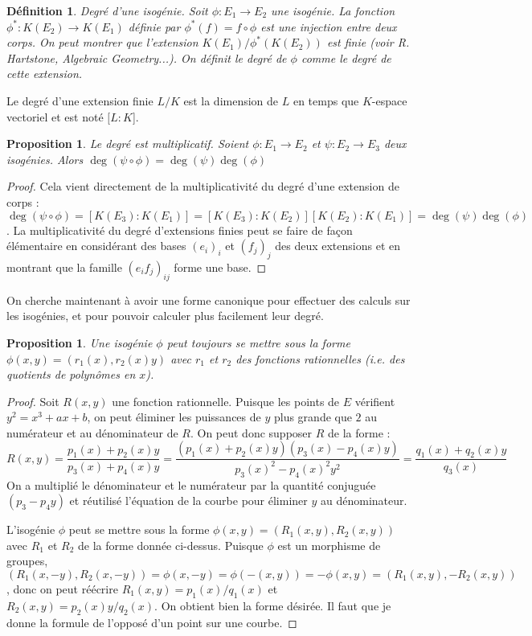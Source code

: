 \documentclass{article}
\theoremstyle{plain}%
\newtheorem{prop}[thm]{Proposition}
\newtheorem{deff}[thm]{Définition}
\theoremstyle{definition}%
\begin{document}
\begin{deff}
  Degré d'une isogénie. Soit $\phi : E_1 \to E_2$ une isogénie. La fonction $\phi^* : K(E_2) \to K(E_1)$ définie par $\phi^*(f) = f \circ \phi$ est une injection entre deux corps. On peut montrer que l'extension $K(E_1)/\phi^*(K(E_2))$ est finie (voir R. Hartstone, Algebraic Geometry...). On définit le degré de $\phi$ comme le degré de cette extension.
\end{deff}

Le degré d'une extension finie $L/K$ est la dimension de $L$ en temps que $K$-espace vectoriel et est noté $[L : K$].

\begin{prop}
  Le degré est multiplicatif. Soient $\phi : E_1\to E_2$ et $\psi : E_2\to E_3$ deux isogénies. Alors $\deg(\psi \circ \phi) = \deg(\psi)\deg(\phi)$ 
\end{prop}

\begin{proof}
  Cela vient directement de la multiplicativité du degré d'une extension de corps : $\deg(\psi \circ \phi) = [K(E_3) :K(E_1)] = [K(E_3):K(E_2)][K(E_2):K(E_1)] = \deg(\psi)\deg(\phi)$. La multiplicativité du degré d'extensions finies peut se faire de façon élémentaire en considérant des bases $(e_i)_i$ et $(f_j)_j$ des deux extensions et en montrant que la famille $(e_if_j)_{ij}$ forme une base.
\end{proof}

On cherche maintenant à avoir une forme canonique pour effectuer des calculs sur les isogénies, et pour pouvoir calculer plus facilement leur degré.

\begin{prop}
  Une isogénie $\phi$ peut toujours se mettre sous la forme $\phi(x, y) = (r_1(x), r_2(x)y)$ avec $r_1$ et $r_2$ des fonctions rationnelles (i.e. des quotients de polynômes en $x$).
\end{prop}

\begin{proof}
  Soit $R(x, y)$ une fonction rationnelle. Puisque les points de $E$ vérifient $y^2 = x^3 + ax + b$, on peut éliminer les puissances de $y$ plus grande que $2$ au numérateur et au dénominateur de $R$. On peut donc supposer $R$ de la forme : $$R(x, y) = \frac{p_1(x) + p_2(x)y}{p_3(x)+p_4(x)y} = \frac{(p_1(x) + p_2(x)y)(p_3(x)-p_4(x)y)}{p_3(x)^2 - p_4(x)^2y^2} = \frac{q_1(x) +q_2(x)y}{q_3(x)} $$
 On a multiplié le dénominateur et le numérateur par la quantité conjuguée $(p_3-p_4y)$ et réutilisé l'équation de la courbe pour éliminer $y$ au dénominateur.

 L'isogénie $\phi$ peut se mettre sous la forme $\phi(x, y) = (R_1(x, y), R_2(x, y))$ avec $R_1$ et $R_2$ de la forme donnée ci-dessus. Puisque $\phi$ est un morphisme de groupes, 
 $(R_1(x, -y), R_2(x, -y)) = \phi(x, -y) = \phi(-(x, y)) = -\phi(x, y) = (R_1(x, y), -R_2(x, y))$, donc on peut réécrire $R_1(x, y) = p_1(x) / q_1(x)$ et $R_2(x, y) = p_2(x)y/q_2(x)$. On obtient bien la forme désirée. {\color{red}Il faut que je donne la formule de l'opposé d'un point sur une courbe.}
\end{proof}
\end{document}
